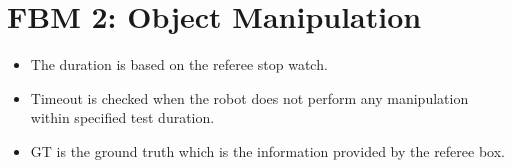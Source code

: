 \section*{FBM 2: Object Manipulation}


\begin{itemize}
\item The duration is based on the referee stop watch.
\item Timeout is checked when the robot does not perform any manipulation within specified test duration.
\item GT is the ground truth which is the information provided by the referee box. 
\end{itemize}

\vspace{0.5cm}


